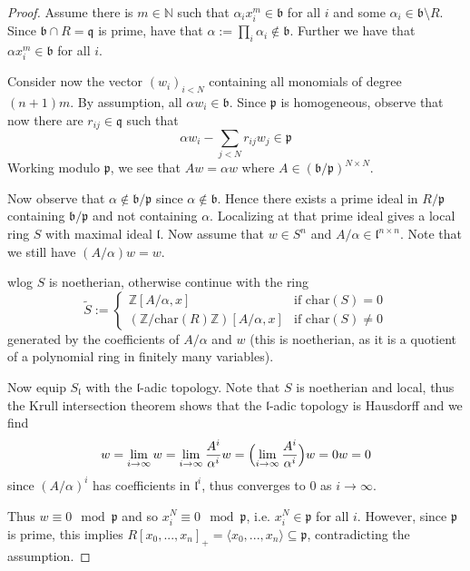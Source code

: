 \documentclass{scrartcl}
\newcommand{\N}{\mathbb{N}}
\newcommand{\Z}{\mathbb{Z}}
\newcommand{\p}{\mathfrak{p}}
\newcommand{\q}{\mathfrak{q}}
\renewcommand{\b}{\mathfrak{b}}
\theoremstyle{definition}
\begin{document}
\begin{proof}
    Assume there is $m \in \N$ such that $\alpha_i x_i^m \in \b$ for all $i$ and some $\alpha_i \in \b \setminus R$.
    Since $\b \cap R = \q$ is prime, have that $\alpha := \prod_i \alpha_i \notin \b$.
    Further we have that $\alpha x_i^m \in \b$ for all $i$.

    Consider now the vector $(w_i)_{i < N}$ containing all monomials of degree $(n + 1)m$.
    By assumption, all $\alpha w_i \in \b$.
    Since $\p$ is homogeneous, observe that now there are $r_{ij} \in \q$ such that
    \begin{equation*}
        \alpha w_i - \sum_{j < N} r_{ij} w_j \in \p
    \end{equation*}
    Working modulo $\p$, we see that $A w = \alpha w$ where $A \in (\b/\p)^{N \times N}$.

    Now observe that $\alpha \notin \b/\p$ since $\alpha \notin \b$.
    Hence there exists a prime ideal in $R/\p$ containing $\b/\p$ and not containing $\alpha$.
    Localizing at that prime ideal gives a local ring $S$ with maximal ideal $\mathfrak{l}$.
    Now assume that $w \in S^n$ and $A/\alpha \in \mathfrak{l}^{n \times n}$.
    Note that we still have $(A/\alpha) w = w$.

    wlog $S$ is noetherian, otherwise continue with the ring
    \begin{equation*}
        \tilde{S} := \begin{cases}
            \Z[A/\alpha, x] & \text{if $\mathrm{char}(S) = 0$} \\
            (\Z/\mathrm{char}(R)\Z)[A/\alpha, x] & \text{if $\mathrm{char}(S) \neq 0$}
        \end{cases}
    \end{equation*}
    generated by the coefficients of $A/\alpha$ and $w$ (this is noetherian, as it is a quotient of a polynomial ring in finitely many variables).
    
    Now equip $S_{\mathfrak{l}}$ with the $\mathfrak{l}$-adic topology.
    Note that $S$ is noetherian and local, thus the Krull intersection theorem shows that the $\mathfrak{l}$-adic topology is Hausdorff and we find
    \begin{equation*}
        w = \lim_{i \to \infty} w = \lim_{i \to \infty} \frac {A^i} {\alpha^i} w = \Bigl( \lim_{i \to \infty} \frac {A^i} {\alpha^i} \Bigr) w = 0 w = 0
    \end{equation*}
    since $(A/\alpha)^i$ has coefficients in $\mathfrak{l}^i$, thus converges to $0$ as $i \to \infty$.

    Thus $w \equiv 0 \mod \p$ and so $x_i^N \equiv 0 \mod \p$, i.e. $x_i^N \in \p$ for all $i$.
    However, since $\p$ is prime, this implies $R[x_0, ..., x_n]_+ = \langle x_0, ..., x_n \rangle \subseteq \p$, contradicting the assumption. 
\end{proof}
\end{document}
